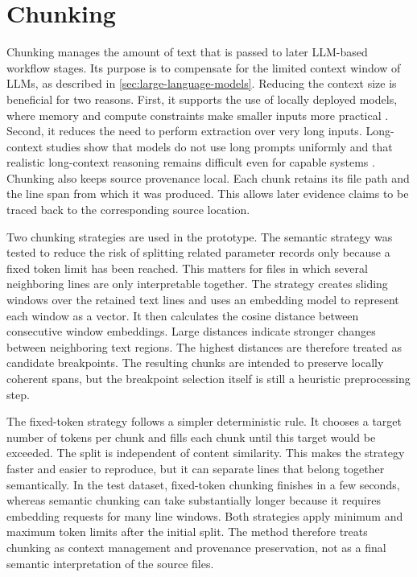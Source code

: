 \section{Chunking}
\label{sec:chunking}

Chunking manages the amount of text that is passed to later \ac{LLM}-based workflow stages.
Its purpose is to compensate for the limited context window of \acp{LLM}, as described in \cref{sec:large-language-models}.
Reducing the context size is beneficial for two reasons.
First, it supports the use of locally deployed models, where memory and compute constraints make smaller inputs more practical \cite{xu2024ondevice}.
Second, it reduces the need to perform extraction over very long inputs.
Long-context studies show that models do not use long prompts uniformly and that realistic long-context reasoning remains difficult even for capable systems \cite{liu2024lostmiddle,bai2025longbenchv2}.
Chunking also keeps source provenance local.
Each chunk retains its file path and the line span from which it was produced.
This allows later evidence claims to be traced back to the corresponding source location.

Two chunking strategies are used in the prototype.
The semantic strategy was tested to reduce the risk of splitting related parameter records only because a fixed token limit has been reached.
This matters for files in which several neighboring lines are only interpretable together.
The strategy creates sliding windows over the retained text lines and uses an embedding model to represent each window as a vector.
It then calculates the cosine distance between consecutive window embeddings.
Large distances indicate stronger changes between neighboring text regions.
The highest distances are therefore treated as candidate breakpoints.
The resulting chunks are intended to preserve locally coherent spans, but the breakpoint selection itself is still a heuristic preprocessing step.

The fixed-token strategy follows a simpler deterministic rule.
It chooses a target number of tokens per chunk and fills each chunk until this target would be exceeded.
The split is independent of content similarity.
This makes the strategy faster and easier to reproduce, but it can separate lines that belong together semantically.
In the test dataset, fixed-token chunking finishes in a few seconds, whereas semantic chunking can take substantially longer because it requires embedding requests for many line windows.
Both strategies apply minimum and maximum token limits after the initial split.
The method therefore treats chunking as context management and provenance preservation, not as a final semantic interpretation of the source files.

